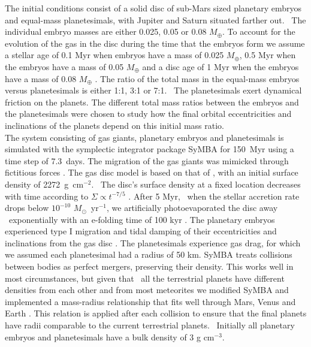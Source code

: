 \documentclass[preprint,5p,times,authoryear]{elsarticle}
\begin{document}
The initial conditions consist of a solid disc of sub-Mars sized planetary embryos and equal-mass planetesimals, with Jupiter and 
Saturn situated farther out. {\ The individual embryo masses are either 0.025, 0.05 or 0.08 $M_\oplus$. To account for the 
evolution of the gas in the disc during the time that the embryos form we assume a stellar age of 0.1 Myr when embryos have a mass of 
0.025 $M_\oplus$, 0.5 Myr when the embryos have a mass of 0.05 $M_\oplus$ and a disc age of 1 Myr when the embryos have a mass of 0.08 
$M_\oplus$ \citep{B16}.} The ratio of the total mass in the equal-mass embryos versus planetesimals is either 1:1, 3:1 or 7:1. {\ 
The planetesimals exert dynamical friction on the planets. The different total mass ratios between the embryos and the planetesimals 
were chosen to study how the final orbital eccentricities and inclinations of the planets depend on this initial mass ratio.}\\

The system consisting of gas giants, planetary embryos and planetesimals is simulated with the symplectic integrator package 
SyMBA \citep{Dll98} for 150~Myr using a time step of 7.3~days. The migration of the gas giants was mimicked through fictitious forces 
\citep{W11}. The gas disc model is based on that of \citet{B14}, with an initial surface density of 2272~g~cm$^{-2}$. {\ The disc's 
surface density at a fixed location decreases with time according to $\Sigma \propto t^{-7/5}$ \citep{H98}.} After 5 Myr, {\ when 
the stellar accretion rate drops below $10^{-10}$ $M_\odot$~yr$^{-1}$}, we artificially photoevaporated the disc away {\ 
exponentially with an e-folding time of} 100 kyr \citep{B14}. The planetary embryos experienced type I migration and tidal damping of 
their eccentricities and inclinations from the gas disc \citep{TW04}. The planetesimals experience gas drag, for which we assumed each 
planetesimal had a radius of 50 km. SyMBA treats collisions between bodies as perfect mergers, preserving their density. This works 
well in most circumstances, but given that {\ all the terrestrial planets have different densities from each other and from most 
meteorites} we modified SyMBA and implemented a mass-radius relationship that fits well through Mars, Venus and Earth \citep{S07}. 
This relation is applied after each collision to ensure that the final planets have radii comparable to the current terrestrial 
planets. {\ Initially all planetary embryos and planetesimals have a bulk density of 3 g cm$^{-3}$.} \\
\end{document}
